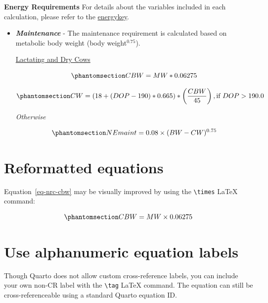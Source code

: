 \documentclass[
  letterpaper,
  oneside,
  openany]{scrbook}
\begin{document}
\textbf{Energy Requirements} For details about the variables included in
each calculation, please refer to the
\href{energy\%20requirements\%20key}{energykey}.

\begin{itemize}
\item
  \textbf{\emph{Maintenance}} - The maintenance requirement is
  calculated based on metabolic body weight (body weight\(^{0.75}\)).

  \ul{Lactating and Dry Cows}

  \begin{equation}\protect\phantomsection\label{eq-nrc-cbw}{
  CBW = MW * 0.06275
  }\end{equation}

  \begin{equation}\protect\phantomsection\label{eq-nrc-cw}{
  CW = {(18 + (DOP - 190) * 0.665) * \left(\frac{CBW}{45}\right), \text{if } DOP > 190.0}
  }\end{equation}

  \emph{Otherwise}

  \begin{equation}\protect\phantomsection\label{eq-nrc-ne-maint}{
  NEmaint = 0.08 \times (BW - CW)^{0.75}
  }\end{equation}
\end{itemize}

\section{Reformatted equations}\label{reformatted-equations}

Equation~\ref{eq-nrc-cbw} may be visually improved by using the
\texttt{\textbackslash{}times} LaTeX command:

\begin{equation}\protect\phantomsection\label{eq-nrc-cbw-times}{
CBW = MW \times 0.06275
}\end{equation}

\section{Use alphanumeric equation
labels}\label{use-alphanumeric-equation-labels}

Though Quarto does not allow custom cross-reference labels, you can
include your own non-CR label with the \texttt{\textbackslash{}tag}
LaTeX command. The equation can still be cross-referenceable using a
standard Quarto equation ID.
\end{document}
